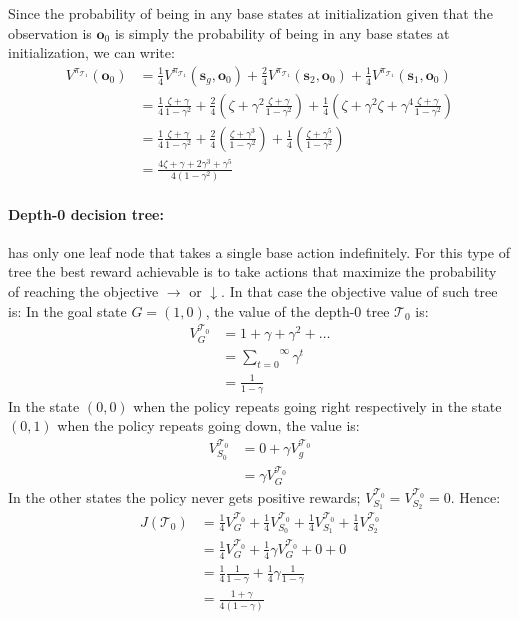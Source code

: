     Since the probability of being in any base states at initialization given that the observation is $\boldsymbol{o}_0$ is simply the probability of being in any base states at initialization, we can write:
    \begin{align*}
        V^{\pi_{\mathcal{T}_1}} (\boldsymbol{o}_0) &= \frac{1}{4} V^{\pi_{\mathcal{T}_1}} (\boldsymbol{s}_g, \boldsymbol{o}_0) + \frac{2}{4} V^{\pi_{\mathcal{T}_1}} (\boldsymbol{s}_2, \boldsymbol{o}_0) + \frac{1}{4} V^{\pi_{\mathcal{T}_1}} (\boldsymbol{s}_1, \boldsymbol{o}_0) \\
        &= \frac{1}{4} \frac{\zeta + \gamma}{1 - \gamma^2} + \frac{2}{4} (\zeta + \gamma^2 \frac{\zeta + \gamma}{1 - \gamma^2}) + \frac{1}{4} (\zeta + \gamma^2 \zeta + \gamma^4 \frac{\zeta + \gamma}{1 - \gamma^2}) \\
        &= \frac{1}{4} \frac{\zeta + \gamma}{1 - \gamma^2} + \frac{2}{4} (\frac{\zeta + \gamma ^ 3}{1-\gamma^2}) + \frac{1}{4}(\frac{\zeta+\gamma^5}{1-\gamma^2}) \\
        &= \frac{4\zeta + \gamma + 2\gamma^3 + \gamma^5}{4(1-\gamma^2)}
    \end{align*}

\paragraph{Depth-0 decision tree:} has only one leaf node that takes a single base action indefinitely.
For this type of tree the best reward achievable is to take actions that maximize the probability of reaching the objective $\rightarrow$ or $\downarrow$. In that case the objective value of such tree is:
In the goal state $G = (1, 0)$, the value of the depth-0 tree $\mathcal{T}_0$ is:
\begin{align*}
    V^{\mathcal{T}_0}_G &= 1 + \gamma + \gamma^2 + \dots \\
    &= \overset{\infty}{\underset{t=0}\sum} \gamma^t \\
    &= \frac{1}{1 - \gamma}
\end{align*}
In the state $(0, 0)$ when the policy repeats going right respectively in the state $(0, 1)$ when the policy repeats going down, the value is:
\begin{align*}
    V^{\mathcal{T}_0}_{S_0} &= 0 + \gamma V^{\mathcal{T}_0}_g \\
    &= \gamma V^{\mathcal{T}_0}_G
\end{align*}
In the other states the policy never gets positive rewards; $V^{\mathcal{T}_0}_{S_1} = V^{\mathcal{T}_0}_{S_2} = 0$. Hence:
\begin{align*}
J(\mathcal{T}_0) &= \frac{1}{4} V^{\mathcal{T}_0}_G + \frac{1}{4} V^{\mathcal{T}_0}_{S_0}+ \frac{1}{4} V^{\mathcal{T}_0}_{S_1}+ \frac{1}{4} V^{\mathcal{T}_0}_{S_2} \\
&= \frac{1}{4} V^{\mathcal{T}_0}_G + \frac{1}{4} \gamma V^{\mathcal{T}_0}_G + 0 + 0\\
&= \frac{1}{4} \frac{1}{1 - \gamma} + \frac{1}{4} \gamma \frac{1}{1 - \gamma} \\
&= \frac{1 + \gamma}{4(1 - \gamma)}
\end{align*}

